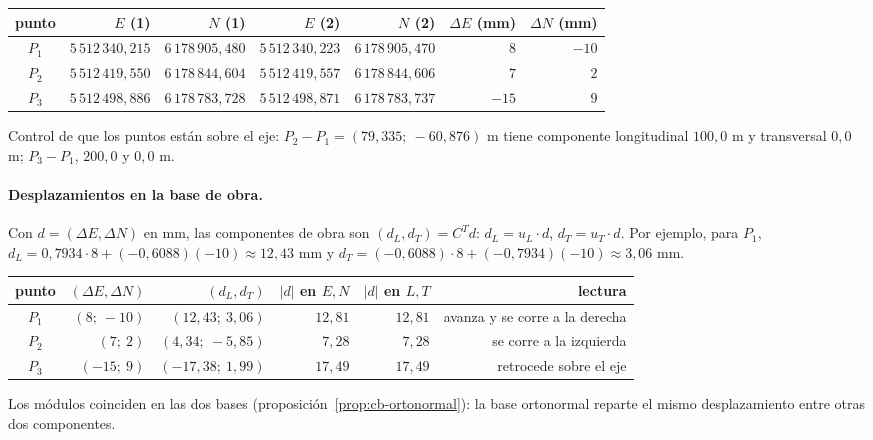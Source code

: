 \begin{center}
\small
\begin{tabular}{crrrrrr}
\toprule
punto & \(E\) (1) & \(N\) (1) & \(E\) (2) & \(N\) (2) & \(\Delta E\) (mm) & \(\Delta N\) (mm)\\
\midrule
\(P_1\) & \(5\,512\,340{,}215\) & \(6\,178\,905{,}480\) & \(5\,512\,340{,}223\) & \(6\,178\,905{,}470\) & \(8\) & \(-10\)\\
\(P_2\) & \(5\,512\,419{,}550\) & \(6\,178\,844{,}604\) & \(5\,512\,419{,}557\) & \(6\,178\,844{,}606\) & \(7\) & \(2\)\\
\(P_3\) & \(5\,512\,498{,}886\) & \(6\,178\,783{,}728\) & \(5\,512\,498{,}871\) & \(6\,178\,783{,}737\) & \(-15\) & \(9\)\\
\bottomrule
\end{tabular}
\end{center}

Control de que los puntos están sobre el eje: \(P_2-P_1=(79{,}335;\ -60{,}876)\) m tiene
componente longitudinal \(100{,}0\) m y transversal \(0{,}0\) m; \(P_3-P_1\), \(200{,}0\) y
\(0{,}0\) m.

\paragraph{Desplazamientos en la base de obra.} Con \(d=(\Delta E,\Delta N)\) en mm, las
componentes de obra son \((d_L,d_T)=C^Td\): \(d_L=u_L\cdot d\), \(d_T=u_T\cdot d\). Por
ejemplo, para \(P_1\), \(d_L=0{,}7934\cdot8+(-0{,}6088)(-10)\approx12{,}43\) mm y
\(d_T=(-0{,}6088)\cdot8+(-0{,}7934)(-10)\approx3{,}06\) mm.

\begin{center}
\small
\begin{tabular}{crrrrr}
\toprule
punto & \((\Delta E,\Delta N)\) & \((d_L,d_T)\) & \(\lvert d\rvert\) en \(E,N\) & \(\lvert d\rvert\) en \(L,T\) & lectura\\
\midrule
\(P_1\) & \((8;\ -10)\) & \((12{,}43;\ 3{,}06)\) & \(12{,}81\) & \(12{,}81\) & avanza y se corre a la derecha\\
\(P_2\) & \((7;\ 2)\) & \((4{,}34;\ -5{,}85)\) & \(7{,}28\) & \(7{,}28\) & se corre a la izquierda\\
\(P_3\) & \((-15;\ 9)\) & \((-17{,}38;\ 1{,}99)\) & \(17{,}49\) & \(17{,}49\) & retrocede sobre el eje\\
\bottomrule
\end{tabular}
\end{center}

Los módulos coinciden en las dos bases (proposición~\ref{prop:cb-ortonormal}): la base
ortonormal reparte el mismo desplazamiento entre otras dos componentes.

